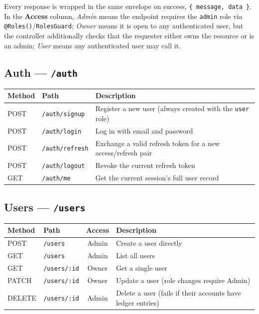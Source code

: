 \documentclass[11pt]{article}
\begin{document}
Every response is wrapped in the same envelope on success,
\texttt{\{ message, data \}}. In the \textbf{Access} column, \emph{Admin}
means the endpoint requires the \texttt{admin} role via
\texttt{@Roles()}/\texttt{RolesGuard}; \emph{Owner} means it is open to any
authenticated user, but the controller additionally checks that the
requester either owns the resource or is an admin; \emph{User} means any
authenticated user may call it.

\subsection*{Auth --- \texttt{/auth}}

\begin{tabularx}{\textwidth}{@{}llX@{}}
\toprule
Method & Path & Description \\
\midrule
POST & \texttt{/auth/signup} & Register a new user (always created with the \texttt{user} role) \\
POST & \texttt{/auth/login} & Log in with email and password \\
POST & \texttt{/auth/refresh} & Exchange a valid refresh token for a new access/refresh pair \\
POST & \texttt{/auth/logout} & Revoke the current refresh token \\
GET & \texttt{/auth/me} & Get the current session's full user record \\
\bottomrule
\end{tabularx}

\subsection*{Users --- \texttt{/users}}

\begin{tabularx}{\textwidth}{@{}llcX@{}}
\toprule
Method & Path & Access & Description \\
\midrule
POST & \texttt{/users} & Admin & Create a user directly \\
GET & \texttt{/users} & Admin & List all users \\
GET & \texttt{/users/:id} & Owner & Get a single user \\
PATCH & \texttt{/users/:id} & Owner & Update a user (role changes require Admin) \\
DELETE & \texttt{/users/:id} & Admin & Delete a user (fails if their accounts have ledger entries) \\
\bottomrule
\end{tabularx}
\end{document}
